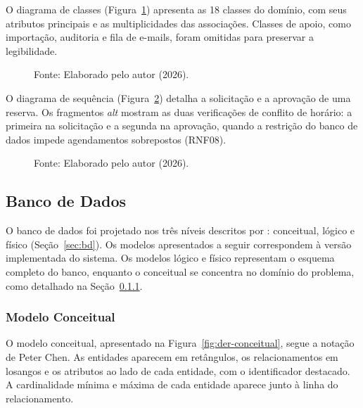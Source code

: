 O diagrama de classes (Figura~\ref{fig:classes}) apresenta as 18 classes do domínio, com seus atributos principais e as multiplicidades das associações. Classes de apoio, como importação, auditoria e fila de e-mails, foram omitidas para preservar a legibilidade.

\begin{figure}[p]
    \centering
    \caption{Diagrama de classes do sistema}
    \resizebox{\textwidth}{!}{}
    \caption*{Fonte: Elaborado pelo autor (2026).}
    \label{fig:classes}
\end{figure}

O diagrama de sequência (Figura~\ref{fig:sequencia}) detalha a solicitação e a aprovação de uma reserva. Os fragmentos \textit{alt} mostram as duas verificações de conflito de horário: a primeira na solicitação e a segunda na aprovação, quando a restrição do banco de dados impede agendamentos sobrepostos (RNF08).

\begin{figure}[p]
    \centering
    \caption{Diagrama de sequência da solicitação e aprovação de reserva}
    \resizebox{\textwidth}{!}{}
    \caption*{Fonte: Elaborado pelo autor (2026).}
    \label{fig:sequencia}
\end{figure}

\clearpage
\subsection{Banco de Dados}
\label{sec:resultado-banco}

O banco de dados foi projetado nos três níveis descritos por : conceitual, lógico e físico (Seção~\ref{sec:bd}). Os modelos apresentados a seguir correspondem à versão implementada do sistema. Os modelos lógico e físico representam o esquema completo do banco, enquanto o conceitual se concentra no domínio do problema, como detalhado na Seção~\ref{sec:modelo-conceitual}.

\subsubsection{Modelo Conceitual}
\label{sec:modelo-conceitual}

O modelo conceitual, apresentado na Figura~\ref{fig:der-conceitual}, segue a notação de Peter Chen. As entidades aparecem em retângulos, os relacionamentos em losangos e os atributos ao lado de cada entidade, com o identificador destacado. A cardinalidade mínima e máxima de cada entidade aparece junto à linha do relacionamento.

